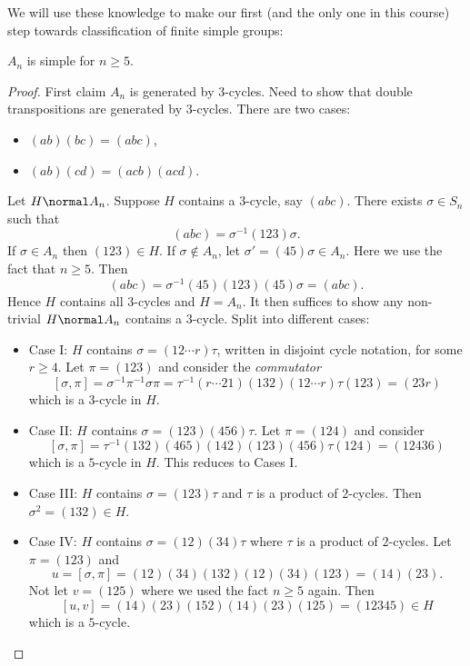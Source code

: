 \documentclass[a4paper]{article}
\theoremstyle{definition}
\begin{document}
We will use these knowledge to make our first (and the only one in this course) step towards classification of finite simple groups:

\begin{theorem}
  \(A_n\) is simple for \(n \geq 5\).
\end{theorem}

\begin{proof}
  First claim \(A_n\) is generated by \(3\)-cycles. Need to show that double transpositions are generated by \(3\)-cycles. There are two cases:
  \begin{itemize}
  \item \((ab)(bc) = (abc)\),
  \item \((ab)(cd) = (acb)(acd)\).
  \end{itemize}

  Let \(H \normal A_n\). Suppose \(H\) contains a \(3\)-cycle, say \((abc)\). There exists \(\sigma \in S_n\) such that
  \[
    (abc) = \sigma^{-1}(123)\sigma.
  \]
  If \(\sigma \in A_n\) then \((123) \in H\). If \(\sigma \notin A_n\), let \(\sigma' = (45)\sigma \in A_n\). Here we use the fact that \(n \geq 5\). Then
  \[
    (abc) = \sigma^{-1}(45)(123)(45)\sigma = (abc).
  \]
  Hence \(H\) contains all \(3\)-cycles and \(H = A_n\). It then suffices to show any non-trivial \(H \normal A_n\) contains a \(3\)-cycle. Split into different cases:
  \begin{itemize}
  \item Case I: \(H\) contains \(\sigma = (12 \cdots r)\tau\), written in disjoint cycle notation, for some \( r \geq 4\). Let \(\pi = (123)\) and consider the \emph{commutator}
    \[
      [\sigma, \pi] = \sigma^{-1}\pi^{-1}\sigma\pi = \tau^{-1}(r \cdots 21)(132)(12 \cdots r)\tau(123) = (23r)
    \]
    which is a \(3\)-cycle in \(H\).
  \item Case II: \(H\) contains \(\sigma = (123)(456)\tau\). Let \(\pi = (124)\) and consider
    \[
      [\sigma, \pi] = \tau^{-1}(132)(465)(142)(123)(456)\tau(124) = (12436)
    \]
    which is a \(5\)-cycle in \(H\). This reduces to Cases I.
  \item Case III: \(H\) contains \(\sigma = (123)\tau\) and \(\tau\) is a product of \(2\)-cycles. Then \(\sigma^2 = (132) \in H\).
  \item Case IV: \(H\) contains \(\sigma = (12)(34)\tau\) where \(\tau\) is a product of \(2\)-cycles. Let \(\pi = (123)\) and
    \[
      u = [\sigma, \pi] = (12)(34)(132)(12)(34)(123) = (14)(23).
    \]
    Not let \(v = (125)\) where we used the fact \(n \geq 5\) again. Then
    \[
      [u, v] = (14)(23)(152)(14)(23)(125) = (12345) \in H
    \]
    which is a \(5\)-cycle.
  \end{itemize}
\end{proof}
\end{document}
